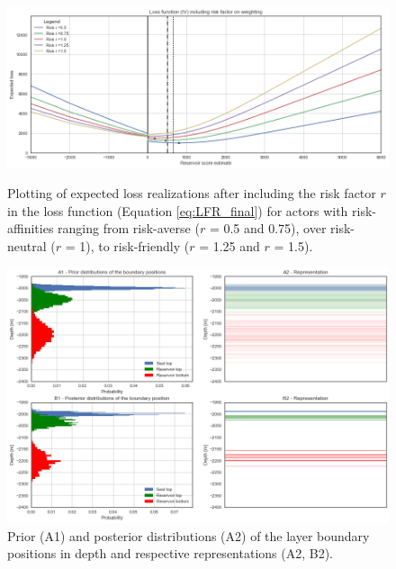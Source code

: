 			\begin{figure}[p!]
				\centering
				\includegraphics[width=1\textwidth]{Figures/LFR.png}
				\caption{Plotting of expected loss realizations after including the risk factor $r$ in the loss function (Equation \ref{eq:LFR_final}) for actors with risk-affinities ranging from risk-averse ($r$ = 0.5 and 0.75), over risk-neutral ($r$ = 1), to risk-friendly ($r$ = 1.25 and $r$ = 1.5).}\label{fig:1D_LFR} 
				\centering
				\includegraphics[width=1\textwidth]{Figures/update_moderate1.png}
				\caption{Prior (A1) and posterior distributions (A2) of the layer boundary positions in depth and respective representations (A2, B2).}\label{fig:update_moderate1} 
			\end{figure}
			
